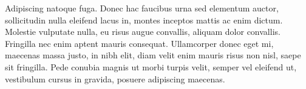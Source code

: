 \documentclass[10pt,letterpaper]{article}
\begin{document}
\begin{flushright}
Adipiscing natoque fuga. Donec hac faucibus urna sed elementum auctor, sollicitudin nulla eleifend lacus in, montes inceptos mattis ac enim dictum. Molestie vulputate nulla, eu risus augue convallis, aliquam dolor convallis. Fringilla nec enim aptent mauris consequat. Ullamcorper donec eget mi, maecenas massa justo, in nibh elit, diam velit enim mauris risus non nisl, saepe sit fringilla. Pede conubia magnis ut morbi turpis velit, semper vel eleifend ut, vestibulum cursus in gravida, posuere adipiscing maecenas.
\end{flushright}
\end{document}
